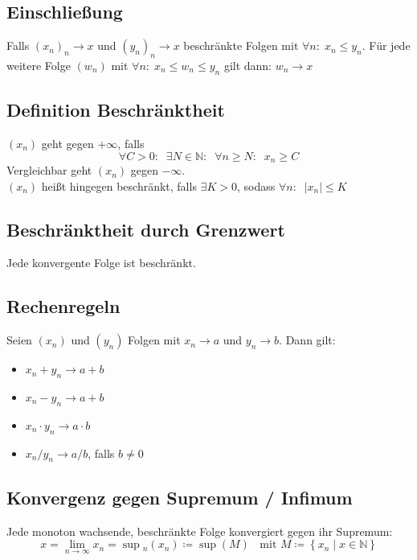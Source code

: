 \documentclass[halfparscip]{scrartcl}
\newcounter{subsection2}
\begin{document}
\subsection{Einschließung}
Falls $(x_n)_n \rightarrow x$ und $(y_n)_n \rightarrow x$ beschränkte Folgen mit $\forall n: \; x_n \leq y_n$. 
Für jede weitere Folge $(w_n)$ mit $\forall n: \; x_n \leq w_n \leq y_n$ gilt dann: $w_n \rightarrow x$

\subsection{Definition Beschränktheit}
$(x_n)$ geht gegen $+\infty$, falls 
\begin{equation*}
	\forall C > 0: \;\; \exists N \in \mathbb{N}: \;\; \forall n \geq N: \;\; x_n \geq C
\end{equation*}
Vergleichbar geht $(x_n)$ gegen $-\infty$. \\
$(x_n)$ heißt hingegen beschränkt, falls $\exists K > 0$, sodass $\forall n : \;\; \vert x_n \vert \leq K$

\subsection{Beschränktheit durch Grenzwert}
Jede konvergente Folge ist beschränkt.

\subsection{Rechenregeln}
Seien $(x_n)$ und $(y_n)$ Folgen mit $x_n \rightarrow a$ und $y_n \rightarrow b$. Dann gilt:
\begin{itemize}
	\item $x_n + y_n \rightarrow a + b$
	\item $x_n - y_n \rightarrow a + b$
	\item $x_n \cdot y_n \rightarrow a \cdot b$
	\item $x_n / y_n \rightarrow a / b$, falls $b \neq 0$
\end{itemize}

\subsection{Konvergenz gegen Supremum / Infimum}
Jede monoton wachsende, beschränkte Folge konvergiert gegen ihr Supremum:
\begin{equation*}
	x = \lim_{n \rightarrow \infty} x_n = \sup\hspace{0cm}_n(x_n) \coloneqq \sup(M) \;\; \text{ mit } M \coloneqq \left\{x_n \;\vert\; x \in \mathbb{N}\right\}
\end{equation*}
\end{document}
